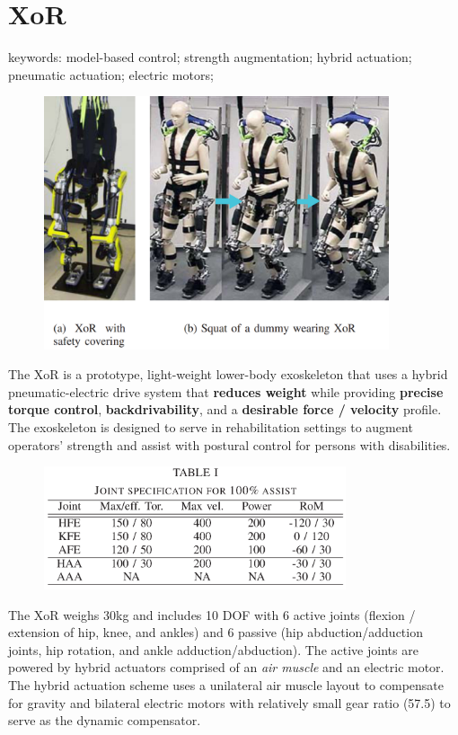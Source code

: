 \section{XoR}
\label{exo:XoR}

keywords: model-based control; strength augmentation; hybrid actuation; pneumatic actuation; electric motors;\\

\begin{figure}[ht]
  \centering
  \includegraphics[width=4.0in]{exos/figs/xor.png}
\end{figure}

The XoR is a prototype, light-weight lower-body exoskeleton that uses a hybrid pneumatic-electric drive system that \textbf{reduces weight} while providing \textbf{precise torque control}, \textbf{backdrivability}, and a \textbf{desirable force / velocity} profile.  The exoskeleton is designed to serve in rehabilitation settings to augment operators' strength and assist with postural control for persons with disabilities.

\begin{figure}[ht]
  \centering
  \includegraphics[width=3.5in]{exos/figs/xor_joint_rom.png}
\end{figure}

The XoR weighs 30kg and includes 10 DOF with 6 active joints (flexion / extension of hip, knee, and ankles) and 6 passive (hip abduction/adduction joints, hip rotation, and ankle adduction/abduction).  The active joints are powered by hybrid actuators comprised of an \emph{air muscle} and an electric motor.  The hybrid actuation scheme uses a unilateral air muscle layout to compensate for gravity and bilateral electric motors with relatively small gear ratio (57.5) to serve as the dynamic compensator.

